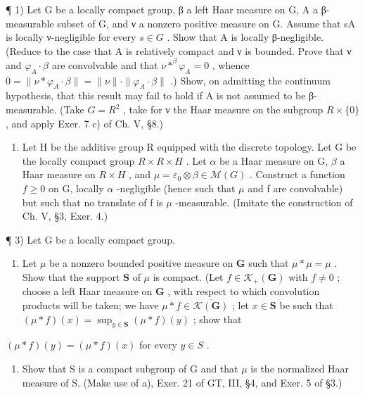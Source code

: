 \exercisesection{}

¶ 1) Let G be a locally compact group, β a left Haar measure on G, A a β-measurable subset of G, and ν a nonzero positive measure on G. Assume that sA is locally ν-negligible for every \(s \in G\) . Show that A is locally β-negligible. (Reduce to the case that A is relatively compact and ν is bounded. Prove that ν and \(\varphi_{A} \cdot \beta\) are convolvable and that \(\nu *^{\beta} \varphi_{A} = 0\) , whence \(0 = \|\nu * \varphi_{A} \cdot \beta\| = \|\nu\| \cdot \|\varphi_{A} \cdot \beta\|\) .) Show, on admitting the continuum hypothesis, that this result may fail to hold if A is not assumed to be β-measurable. (Take \(G = R^{2}\) , take for ν the Haar measure on the subgroup \(R \times \{0\}\) , and apply Exer. 7 c) of Ch. V, §8.)

\begin{enumerate}
\def\labelenumi{\arabic{enumi})}
\setcounter{enumi}{1}
\tightlist
\item
  Let H be the additive group R equipped with the discrete topology. Let G be the locally compact group \(R \times R \times H\) . Let \(\alpha\) be a Haar measure on G, \(\beta\) a Haar measure on \(R \times H\) , and \(\mu = \varepsilon_{0} \otimes \beta \in \mathcal{M}(G)\) . Construct a function \(f \geqslant 0\) on G, locally \(\alpha\) -negligible (hence such that \(\mu\) and f are convolvable) but such that no translate of f is \(\mu\) -measurable. (Imitate the construction of Ch. V, §3, Exer. 4.)
\end{enumerate}

¶ 3) Let G be a locally compact group.

\begin{enumerate}
\def\labelenumi{\alph{enumi})}
\tightlist
\item
  Let \(\mu\) be a nonzero bounded positive measure on \(\mathbf{G}\) such that \(\mu * \mu = \mu\) . Show that the support \(\mathbf{S}\) of \(\mu\) is compact. (Let \(f \in \mathcal{K}_{+}(\mathbf{G})\) with \(f \neq 0\) ; choose a left Haar measure on \(\mathbf{G}\) , with respect to which convolution products will be taken; we have \(\mu * f \in \overline{\mathcal{K}(\mathbf{G})}\) ; let \(x \in \mathbf{S}\) be such that \((\mu * f)(x) = \sup_{y \in \mathbf{S}} (\mu * f)(y)\) ; show that
\end{enumerate}

\((\mu * f)(y) = (\mu * f)(x)\) for every \(y \in S\) .

\begin{enumerate}
\def\labelenumi{\alph{enumi})}
\setcounter{enumi}{1}
\tightlist
\item
  Show that S is a compact subgroup of G and that \(\mu\) is the normalized Haar measure of S. (Make use of a), Exer. 21 of GT, III, §4, and Exer. 5 of §3.)
\end{enumerate}

